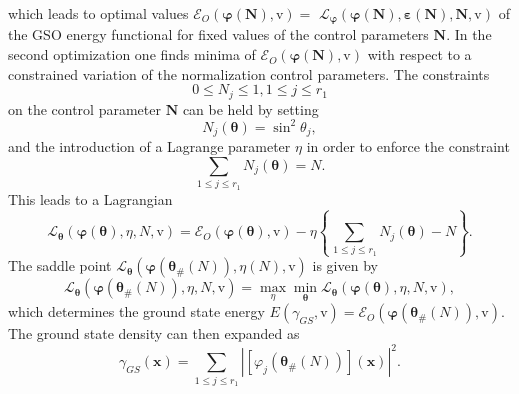 \documentclass[aps,preprint]{revtex4}%
\begin{document}
which leads to optimal values $\mathcal{E}_{O}\left(  \boldsymbol{\varphi
}\left(  \boldsymbol{N}\right)  \boldsymbol{,}\mathrm{v}\right)  =$
$\mathcal{L}_{\boldsymbol{\varphi}}\left(  \boldsymbol{\varphi}\left(
\boldsymbol{N}\right)  ,\boldsymbol{\varepsilon}\left(  \boldsymbol{N}\right)
,\boldsymbol{N,}\mathrm{v}\right)  $ of the GSO energy functional for fixed
values of the control parameters $\boldsymbol{N}$. In the second optimization
one finds minima of $\mathcal{E}_{O}\left(  \boldsymbol{\varphi}\left(
\boldsymbol{N}\right)  \boldsymbol{,}\mathrm{v}\right)  $ with respect to a
constrained variation of the normalization control parameters. The
constraints
\begin{equation}
0\leq N_{j}\leq1,1\leq j\leq r_{1}%
\end{equation}
on the control parameter $\boldsymbol{N}$ can be held by setting
\begin{equation}
N_{j}\left(  \boldsymbol{\theta}\right)  =\sin^{2}\theta_{j},
\end{equation}
and the introduction of a Lagrange parameter $\eta$ in order to enforce the
constraint
\begin{equation}
\sum_{1\leq j\leq r_{1}}N_{j}\left(  \boldsymbol{\theta}\right)  =N.
\end{equation}
This leads to a Lagrangian
\begin{equation}
\mathcal{L}_{\boldsymbol{\theta}}\left(  \boldsymbol{\varphi}\left(
\boldsymbol{\theta}\right)  ,\eta,N,\mathrm{v}\right)  =\mathcal{E}_{O}\left(
\boldsymbol{\varphi}\left(  \boldsymbol{\theta}\right)  \boldsymbol{,}%
\mathrm{v}\right)  -\eta\left\{  \sum_{\,1\leq j\leq r_{1}}N_{j}\left(
\boldsymbol{\theta}\right)  -N\right\}  .
\end{equation}
The saddle point $\mathcal{L}_{\boldsymbol{\theta}}\left(  \boldsymbol{\varphi
}\left(  \boldsymbol{\theta}_{\#}\left(  N\right)  \right)  ,\eta\left(
N\right)  ,\mathrm{v}\right)  $ is given by
\begin{equation}
\mathcal{L}_{\boldsymbol{\theta}}\left(  \boldsymbol{\varphi}\left(
\boldsymbol{\theta}_{\#}\left(  N\right)  \right)  ,\eta,N,\mathrm{v}\right)
=\max_{\eta}\min_{\boldsymbol{\theta}}\mathcal{L}_{\boldsymbol{\theta}}\left(
\boldsymbol{\varphi}\left(  \boldsymbol{\theta}\right)  ,\eta,N,\mathrm{v}%
\right)  ,
\end{equation}
which determines the ground state energy $E\left(  \gamma_{GS}\boldsymbol{,}%
\mathrm{v}\right)  =\mathcal{E}_{O}\left(  \boldsymbol{\varphi}\left(
\boldsymbol{\theta}_{\#}\left(  N\right)  \right)  ,\mathrm{v}\right)  .$The
ground state density can then expanded as
\begin{equation}
\gamma_{GS}\left(  \boldsymbol{x}\right)  =\sum_{1\leq j\leq r_{1}}\left\vert
\overset{}{\left[  \varphi_{j}\left(  \boldsymbol{\theta}_{\#}\left(
N\right)  \right)  \right]  \left(  \boldsymbol{x}\right)  }\right\vert ^{2}.
\end{equation}
\end{document}
